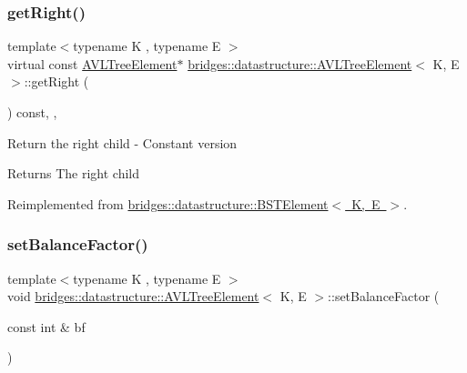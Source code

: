 \subsubsection{\texorpdfstring{get\+Right()}{getRight()}\hspace{0.1cm}{\footnotesize\ttfamily [2/2]}}
{\footnotesize\ttfamily template$<$typename K , typename E $>$ \\
virtual const \mbox{\hyperlink{classbridges_1_1datastructure_1_1_a_v_l_tree_element}{A\+V\+L\+Tree\+Element}}$\ast$ \mbox{\hyperlink{classbridges_1_1datastructure_1_1_a_v_l_tree_element}{bridges\+::datastructure\+::\+A\+V\+L\+Tree\+Element}}$<$ K, E $>$\+::get\+Right (\begin{DoxyParamCaption}{ }\end{DoxyParamCaption}) const\hspace{0.3cm}{\ttfamily [inline]}, {\ttfamily [override]}, {\ttfamily [virtual]}}

Return the right child -\/ Constant version

\begin{DoxyReturn}{Returns}
The right child 
\end{DoxyReturn}


Reimplemented from \mbox{\hyperlink{classbridges_1_1datastructure_1_1_b_s_t_element_a012f0eb09c3d62b14c73109e6ded0879}{bridges\+::datastructure\+::\+B\+S\+T\+Element$<$ K, E $>$}}.

\mbox{\label{classbridges_1_1datastructure_1_1_a_v_l_tree_element_a32af51a86585479c28de425374df95e9}} 
\subsubsection{\texorpdfstring{set\+Balance\+Factor()}{setBalanceFactor()}}
{\footnotesize\ttfamily template$<$typename K , typename E $>$ \\
void \mbox{\hyperlink{classbridges_1_1datastructure_1_1_a_v_l_tree_element}{bridges\+::datastructure\+::\+A\+V\+L\+Tree\+Element}}$<$ K, E $>$\+::set\+Balance\+Factor (\begin{DoxyParamCaption}\item[{const int \&}]{bf }\end{DoxyParamCaption})\hspace{0.3cm}{\ttfamily [inline]}}

